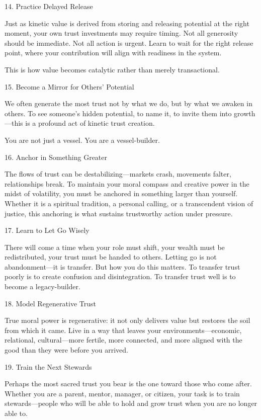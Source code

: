 \documentclass[11pt,oneside]{book}
\begin{document}
14. Practice Delayed Release


Just as kinetic value is derived from storing and releasing potential at the right moment, your own trust investments may require timing. Not all generosity should be immediate. Not all action is urgent. Learn to wait for the right release point, where your contribution will align with readiness in the system.

This is how value becomes catalytic rather than merely transactional.

15. Become a Mirror for Others’ Potential


We often generate the most trust not by what we do, but by what we awaken in others. To see someone’s hidden potential, to name it, to invite them into growth—this is a profound act of kinetic trust creation.

You are not just a vessel. You are a vessel-builder.

16. Anchor in Something Greater


The flows of trust can be destabilizing—markets crash, movements falter, relationships break. To maintain your moral compass and creative power in the midst of volatility, you must be anchored in something larger than yourself. Whether it is a spiritual tradition, a personal calling, or a transcendent vision of justice, this anchoring is what sustains trustworthy action under pressure.

17. Learn to Let Go Wisely


There will come a time when your role must shift, your wealth must be redistributed, your trust must be handed to others. Letting go is not abandonment—it is transfer. But how you do this matters. To transfer trust poorly is to create confusion and disintegration. To transfer trust well is to become a legacy-builder.

18. Model Regenerative Trust


True moral power is regenerative: it not only delivers value but restores the soil from which it came. Live in a way that leaves your environments—economic, relational, cultural—more fertile, more connected, and more aligned with the good than they were before you arrived.

19. Train the Next Stewards


Perhaps the most sacred trust you bear is the one toward those who come after. Whether you are a parent, mentor, manager, or citizen, your task is to train stewards—people who will be able to hold and grow trust when you are no longer able to.
\end{document}
